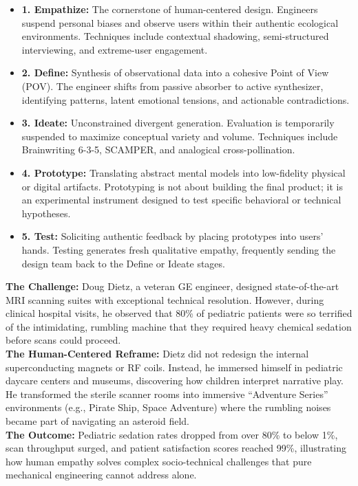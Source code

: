 \begin{methodbox}
\begin{itemize}
    \item \textbf{1. Empathize:} The cornerstone of human-centered design. Engineers suspend personal biases and observe users within their authentic ecological environments. Techniques include contextual shadowing, semi-structured interviewing, and extreme-user engagement.
    \item \textbf{2. Define:} Synthesis of observational data into a cohesive Point of View (POV). The engineer shifts from passive absorber to active synthesizer, identifying patterns, latent emotional tensions, and actionable contradictions.
    \item \textbf{3. Ideate:} Unconstrained divergent generation. Evaluation is temporarily suspended to maximize conceptual variety and volume. Techniques include Brainwriting 6-3-5, SCAMPER, and analogical cross-pollination.
    \item \textbf{4. Prototype:} Translating abstract mental models into low-fidelity physical or digital artifacts. Prototyping is not about building the final product; it is an experimental instrument designed to test specific behavioral or technical hypotheses.
    \item \textbf{5. Test:} Soliciting authentic feedback by placing prototypes into users' hands. Testing generates fresh qualitative empathy, frequently sending the design team back to the Define or Ideate stages.
\end{itemize}
\end{methodbox}

\begin{casestudy}
\textbf{The Challenge:} Doug Dietz, a veteran GE engineer, designed state-of-the-art MRI scanning suites with exceptional technical resolution. However, during clinical hospital visits, he observed that 80\% of pediatric patients were so terrified of the intimidating, rumbling machine that they required heavy chemical sedation before scans could proceed.\\
\textbf{The Human-Centered Reframe:} Dietz did not redesign the internal superconducting magnets or RF coils. Instead, he immersed himself in pediatric daycare centers and museums, discovering how children interpret narrative play. He transformed the sterile scanner rooms into immersive ``Adventure Series'' environments (e.g., Pirate Ship, Space Adventure) where the rumbling noises became part of navigating an asteroid field.\\
\textbf{The Outcome:} Pediatric sedation rates dropped from over 80\% to below 1\%, scan throughput surged, and patient satisfaction scores reached 99\%, illustrating how human empathy solves complex socio-technical challenges that pure mechanical engineering cannot address alone.
\end{casestudy}

